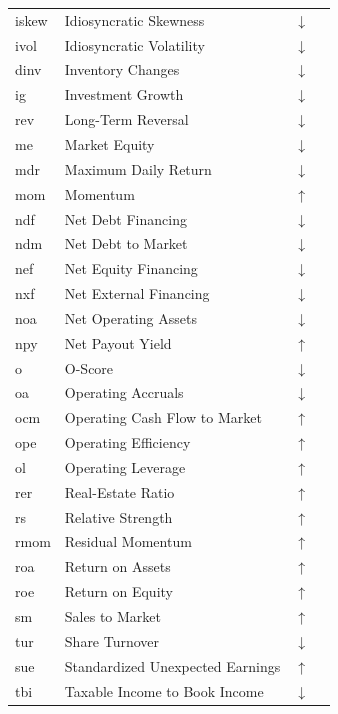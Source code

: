 \documentclass[
  article]{jss}
\begin{document}
\begin{longtable}{lp{5.5cm}lp{6.5cm}}
iskew & Idiosyncratic Skewness & $\downarrow$ & \cite{bali.2016}\\
ivol & Idiosyncratic Volatility & $\downarrow$ & \cite{ang.2006}\\
dinv & Inventory Changes & $\downarrow$ & \cite{thomas.2002}\\
\addlinespace
ig & Investment Growth & $\downarrow$ & \cite{xing.2008}\\
rev & Long-Term Reversal & $\downarrow$ & \cite{debondt.1985}\\
me & Market Equity & $\downarrow$ & \cite{banz.1981}\\
mdr & Maximum Daily Return & $\downarrow$ & \cite{bali.2011}\\
mom & Momentum & $\uparrow$ & \cite{fama.1996}\\
\addlinespace
ndf & Net Debt Financing & $\downarrow$ & \cite{baker.2006}\\
ndm & Net Debt to Market & $\downarrow$ & \cite{penman.2007}\\
nef & Net Equity Financing & $\downarrow$ & \cite{baker.2006}\\
nxf & Net External Financing & $\downarrow$ & \cite{baker.2006}\\
noa & Net Operating Assets & $\downarrow$ & \cite{hirshleifer.2004}\\
\addlinespace
npy & Net Payout Yield & $\uparrow$ & \cite{boudoukh.2007}\\
o & O-Score & $\downarrow$ & \cite{ohlson.1980,dichev.1998}\\
oa & Operating Accruals & $\downarrow$ & \cite{sloan.1996}\\
ocm & Operating Cash Flow to Market & $\uparrow$ & \cite{desai.2004}\\
ope & Operating Efficiency & $\uparrow$ & \cite{fama.2015}\\
\addlinespace
ol & Operating Leverage & $\uparrow$ & \cite{novy-marx.2011}\\
rer & Real-Estate Ratio & $\uparrow$ & \cite{titman.2004}\\
rs & Relative Strength & $\uparrow$ & \cite{jegadeesh.2006}\\
rmom & Residual Momentum & $\uparrow$ & \cite{blitz.2011}\\
roa & Return on Assets & $\uparrow$ & \cite{balakrishnan.2010}\\
\addlinespace
roe & Return on Equity & $\uparrow$ & \cite{hou.2014}\\
sm & Sales to Market & $\uparrow$ & \cite{barbee.1996}\\
tur & Share Turnover & $\downarrow$ & \cite{datar.1998}\\
sue & Standardized Unexpected Earnings & $\uparrow$ & \cite{foster.1984}\\
tbi & Taxable Income to Book Income & $\downarrow$ & \cite{lev.2004}\\
\bottomrule



\end{longtable}
\end{document}
